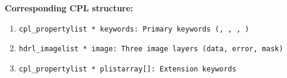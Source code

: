 \begin{datastructdef}
\textbf{Corresponding \ac{CPL} structure:}
\begin{enumerate}
    \item \texttt{cpl\_propertylist * keywords: Primary keywords (\hyperref[fits:pro.catg]{},  \hyperref[fits:ins.opti9.name]{}, \hyperref[fits:ins.opti12.name]{}, \hyperref[fits:ins.opti11.name]{})}
    \item \texttt{hdrl\_imagelist * image: Three image layers (data, error, mask)}
    \item \texttt{cpl\_propertylist * plistarray[]: Extension keywords}
\end{enumerate}
\end{datastructdef}

